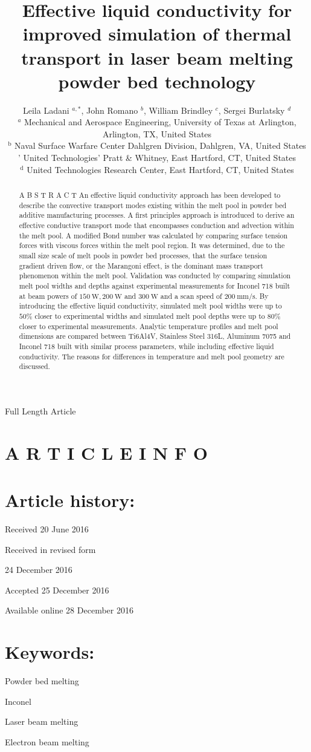 \documentclass[10pt]{article}
\title{Effective liquid conductivity for improved simulation of thermal transport in laser beam melting powder bed technology }
\author{Leila Ladani ${ }^{a, *}$, John Romano ${ }^{b}$, William Brindley ${ }^{c}$, Sergei Burlatsky ${ }^{d}$\\
${ }^{a}$ Mechanical and Aerospace Engineering, University of Texas at Arlington, Arlington, TX, United States\\
${ }^{\mathrm{b}}$ Naval Surface Warfare Center Dahlgren Division, Dahlgren, VA, United States\\
' United Technologies' Pratt \& Whitney, East Hartford, CT, United States\\
${ }^{\mathrm{d}}$ United Technologies Research Center, East Hartford, CT, United States}
\date{}
\begin{document}
\maketitle
Full Length Article



\section*{A R T I C L E I N F O}
\section*{Article history:}
Received 20 June 2016

Received in revised form

24 December 2016

Accepted 25 December 2016

Available online 28 December 2016

\section*{Keywords:}
Powder bed melting

Inconel

Laser beam melting

Electron beam melting

\begin{abstract}
A B S T R A C T An effective liquid conductivity approach has been developed to describe the convective transport modes existing within the melt pool in powder bed additive manufacturing processes. A first principles approach is introduced to derive an effective conductive transport mode that encompasses conduction and advection within the melt pool. A modified Bond number was calculated by comparing surface tension forces with viscous forces within the melt pool region. It was determined, due to the small size scale of melt pools in powder bed processes, that the surface tension gradient driven flow, or the Marangoni effect, is the dominant mass transport phenomenon within the melt pool. Validation was conducted by comparing simulation melt pool widths and depths against experimental measurements for Inconel 718 built at beam powers of $150 \mathrm{~W}, 200 \mathrm{~W}$ and $300 \mathrm{~W}$ and a scan speed of $200 \mathrm{~mm} / \mathrm{s}$. By introducing the effective liquid conductivity, simulated melt pool widths were up to $50 \%$ closer to experimental widths and simulated melt pool depths were up to $80 \%$ closer to experimental measurements. Analytic temperature profiles and melt pool dimensions are compared between Ti6Al4V, Stainless Steel 316L, Aluminum 7075 and Inconel 718 built with similar process parameters, while including effective liquid conductivity. The reasons for differences in temperature and melt pool geometry are discussed.
\end{abstract}
\end{document}
